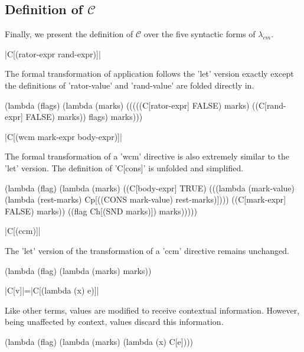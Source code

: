 \documentclass[ms,electronic,twosidetoc,letterpaper,chaptercenter,parttop]{byumsphd}
\newcommand{\cm}{$\lambda_{cm}$}
\begin{document}
\subsection{Definition of $\mathcal{C}$}

Finally, we present the definition of $\mathcal{C}$ over the five syntactic forms of \cm.


\begin{schemedefn}{\scheme|C[(rator-expr rand-expr)]|}

The formal transformation of application follows the \scheme'let' version exactly except the definitions of \scheme'rator-value' and \scheme'rand-value' are folded directly in.
\begin{schemedisplay}
(lambda (flags)
  (lambda (marks)
    (((((C[rator-expr] FALSE) marks)
       ((C[rand-expr] FALSE) marks))
      flags)
     marks)))
\end{schemedisplay}
\end{schemedefn}

\begin{schemedefn}{\scheme|C[(wcm mark-expr body-expr)]|}

The formal transformation of a \scheme'wcm' directive is also extremely similar to the \scheme'let' version. The definition of \scheme'C[cons]' is unfolded and simplified.
\begin{schemedisplay}
(lambda (flag)
  (lambda (marks)
    ((C[body-expr] TRUE)
     (((lambda (mark-value) (lambda (rest-marks) Cp[((CONS mark-value) rest-marks)])))
       ((C[mark-expr] FALSE) marks))
      ((flag Ch[(SND marks)]) marks)))))
\end{schemedisplay}
\end{schemedefn}

\begin{schemedefn}{\scheme|C[(ccm)]|}

The \scheme'let' version of the transformation of a \scheme'ccm' directive remains unchanged.
\begin{schemedisplay}
(lambda (flag)
  (lambda (marks)
    marks))
\end{schemedisplay}
\end{schemedefn}

\begin{schemedefn}{\scheme|C[v]|=\scheme|C[(lambda (x) e)]|}

Like other terms, values are modified to receive contextual information. However, being unaffected by context, values discard this information.
\begin{schemedisplay}
(lambda (flag)
  (lambda (marks)
    (lambda (x) C[e])))
\end{schemedisplay}
\end{schemedefn}
\end{document}
